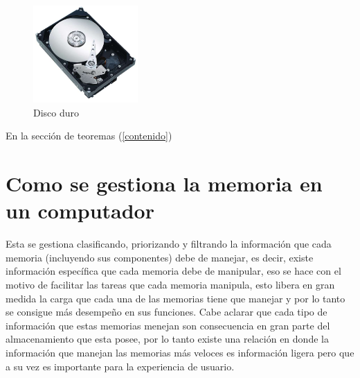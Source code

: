 \documentclass[12pt]{article}
\begin{document}
\begin{itemize}
\begin{figure}[h]
\includegraphics[width=4cm]{disco duro.jpg}
\centering
\caption{Disco duro}
\label{fig:disco duro}
\end{figure}

En la sección de teoremas (\ref{contenido})

\section{Como se gestiona la memoria en un computador}
Esta se gestiona clasificando, priorizando y filtrando la información que cada memoria (incluyendo sus componentes) debe de manejar, es decir, existe información específica que cada memoria debe de manipular, eso se hace con el motivo de facilitar las tareas que cada memoria manipula, esto libera en gran medida la carga que cada una de las memorias tiene que manejar y por lo tanto se consigue más desempeño en sus funciones. Cabe aclarar que cada tipo de información que estas memorias menejan son consecuencia en gran parte del almacenamiento que esta posee, por lo tanto existe una relación en donde la información que manejan las memorias más veloces es información ligera pero que a su vez es importante para la experiencia de usuario.  
\label{conclulsion}



\end{itemize}
\end{document}
